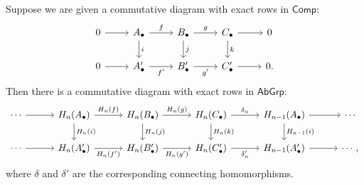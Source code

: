 \begin{proposition}
	\label{prop:naturality_connecting_homomorphism}
	Suppose we are given a commutative diagram with exact rows in $\mathsf{Comp}$:
	\begin{equation*}
		\begin{tikzcd}
			0 \arrow[r] & A_\bullet \arrow[r,"f"]\arrow[d,"i"] & B_\bullet \arrow[r,"g"]\arrow[d,"j"] & C_\bullet \arrow[r]\arrow[d,"k"] & 0\\
			0 \arrow[r] & A_\bullet' \arrow[r,"f'"'] & B_\bullet' \arrow[r,"g'"'] & C_\bullet' \arrow[r] & 0.
		\end{tikzcd}
	\end{equation*}
	Then there is a commutative diagram with exact rows in $\mathsf{AbGrp}$:
	\begin{equation*}
		\begin{tikzcd}[column sep = 7ex]
			\cdots \arrow[r] & H_n(A_\bullet) \arrow[r,"H_n(f)"]\arrow[d,"H_n(i)"] & H_n(B_\bullet) \arrow[r,"H_n(g)"]\arrow[d,"H_n(j)"] & H_n(C_\bullet) \arrow[r,"\delta_n"]\arrow[d,"H_n(k)"] & H_{n - 1}(A_\bullet) \arrow[r]\arrow[d,"H_{n - 1}(i)"] & \cdots\\
			\cdots \arrow[r] & H_n(A_\bullet') \arrow[r,"H_n(f')"'] & H_n(B_\bullet') \arrow[r,"H_n(g')"'] & H_n(C'_\bullet) \arrow[r,"\delta'_n"'] & H_{n - 1}(A'_\bullet) \arrow[r] & \cdots,
		\end{tikzcd}
	\end{equation*}
	\noindent where $\delta$ and $\delta'$ are the corresponding connecting homomorphisms.
\end{proposition}

